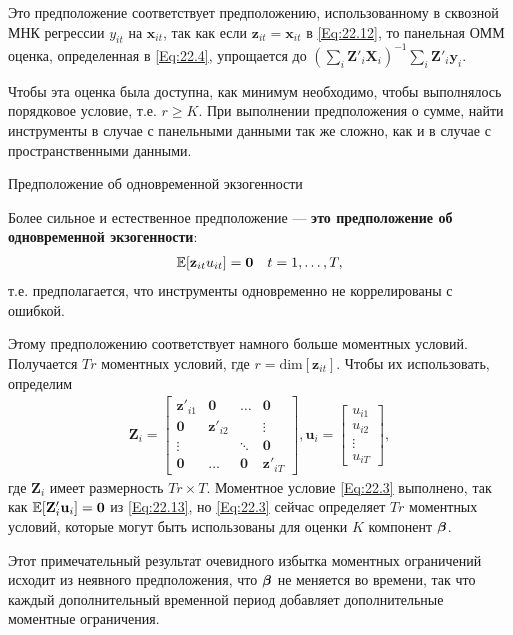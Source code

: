 Это предположение соответствует предположению, использованному в сквозной МНК регрессии $y_{it}$ на $\mathbf x_{it}$, так как если $\mathbf z_{it}=\mathbf x_{it}$ в \ref{Eq:22.12}, то панельная ОММ оценка, определенная в \ref{Eq:22.4}, упрощается до $(\sum_i \mathbf Z'_i \mathbf X_i)^{-1} \sum_i \mathbf Z'_i \mathbf y_i$.

Чтобы эта оценка была доступна, как минимум необходимо, чтобы выполнялось порядковое условие, т.е. $r \geq K$. При выполнении предположения о сумме, найти инструменты в случае с панельными данными так же сложно, как и в случае с пространственными данными.

{\centering Предположение об одновременной экзогенности}

Более сильное и естественное предположение --- \textbf{это предположение об одновременной экзогенности}:
\begin{align}
&\mathbb{E} [\mathbf z_{it} u_{it}] =\mathbf 0
& t=1, \dots, T,
\label{Eq:22.13}
\end{align}
т.е. предполагается, что инструменты одновременно не коррелированы с ошибкой.

Этому предположению соответствует намного больше моментных условий. Получается $Tr$ моментных условий, где $r=\mathrm{dim}[\mathbf z_{it}]$. Чтобы их использовать, определим
\begin{align}
\mathbf Z_i=
\begin{bmatrix}
\mathbf z'_{i1}  &\mathbf 0 & \dots & \mathbf 0\\
\mathbf 0 & \mathbf z'_{i2} & & \vdots \\
\vdots & & \ddots & \mathbf 0 \\
\mathbf 0 & \hdots & \mathbf 0 & \mathbf z'_{iT}  
\end{bmatrix},
\mathbf u_i=
\begin{bmatrix}
u_{i1} \\
u_{i2} \\
\vdots \\
u_{iT}
\end{bmatrix},
\label{Eq:22.14}
\end{align}
где $\mathbf Z_i$ имеет размерность $Tr \times T$. Моментное условие \ref{Eq:22.3} выполнено, так как $\mathbb{E}[ \mathbf Z'_i \mathbf u_i]= \mathbf 0$ из \ref{Eq:22.13}, но \ref{Eq:22.3} сейчас определяет $Tr$ моментных условий, которые могут быть использованы для оценки $K$ компонент $\bm{\beta}$.

Этот примечательный результат очевидного избытка моментных ограничений исходит из неявного предположения, что $\bm{\beta}$ не меняется во времени, так что каждый дополнительный временной период добавляет дополнительные моментные ограничения.

